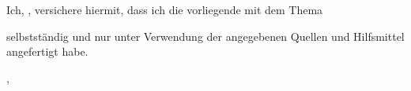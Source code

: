 Ich, \autor, versichere hiermit, dass ich die vorliegende \art  { }mit dem Thema

\begin{quote}
    \textit{\titel} \textit{\untertitel}
\end{quote}

selbstständig und nur unter Verwendung der angegebenen Quellen und Hilfsmittel angefertigt habe.

\begin{flushright}
    \ort, \datum
\end{flushright}
\small{\autor} 